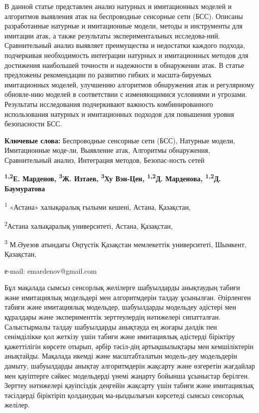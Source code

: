 В данной статье представлен анализ натурных и имитационных моделей и
алгоритмов выявления атак на беспроводные сенсорные сети (БСС). Описаны
разработанные натурные и имитационные модели, методы и инструменты для
имитации атак, а также результаты экспериментальных исследова-ний.
Сравнительный анализ выявляет преимущества и недостатки каждого подхода,
подчеркивая необходимость интеграции натурных и имитационных методов для
достижения наибольшей точности и надежности в обнаружении атак. В статье
предложены рекомендации по развитию гибких и масшта-бируемых имитационных
моделей, улучшению алгоритмов обнаружения атак и регулярному обновле-нию
моделей в соответствии с изменяющимися условиями и угрозами. Результаты
исследования подчеркивают важность комбинированного использования
натурных и имитационных подходов для повышения уровня безопасности БСС.

{\bfseries Ключевые слова:} Беспроводные сенсорные сети (БСС), Натурные
модели, Имитационные моде-ли, Выявление атак, Алгоритмы обнаружения,
Сравнительный анализ, Интеграция методов, Безопас-ность сетей


\begin{center}
{\bfseries \textsuperscript{1,2}Е. Марденов\envelope,
\textsuperscript{3}Ж. Изтаев, \textsuperscript{3}Ху Вэн-Цен,
\textsuperscript{1,2}Д. Марденова, \textsuperscript{1,2}Д. Баумуратова}

\textsuperscript{1} «Астана» халықаралық ғылыми кешені, Астана,
Қазақстан,

\textsuperscript{2}Астана халықаралық университеті, Астана, Қазақстан,

\textsuperscript{3} М.Әуезов атындағы Оңтүстік Қазақстан мемлекеттік
университеті, Шымкент, Қазақстан,

е-mail: emardenov@gmail.com
\end{center}

Бұл мақалада сымсыз сенсорлық желілерге шабуылдарды анықтаудың табиғи
және имитациялық модельдері мен алгоритмдерін талдау ұсынылған.
Әзірленген табиғи және имитациялық модельдер, шабуылдарды модельдеу
әдістері мен құралдары және эксперименттік зерттеулердің нәтижелері
сипатталған. Салыстырмалы талдау шабуылдарды анықтауда ең жоғары дәлдік
пен сенімділікке қол жеткізу үшін табиғи және имитациялық әдістерді
біріктіру қажеттілігін көрсете отырып, әрбір тәсіл-дің артықшылықтары мен
кемшіліктерін анықтайды. Мақалада икемді және масштабталатын модель-деу
модельдерін дамыту, шабуылдарды анықтау алгоритмдерін жақсарту және
өзгеретін жағдайлар мен қауіптерге сәйкес модельдерді үнемі жаңарту
бойынша ұсыныстар берілген. Зерттеу нәтижелері қауіпсіздік деңгейін
жақсарту үшін табиғи және имитациялық тәсілдерді біріктіріп қолданудың
ма-ңыздылығын көрсетеді сымсыз сенсорлық желілер.

